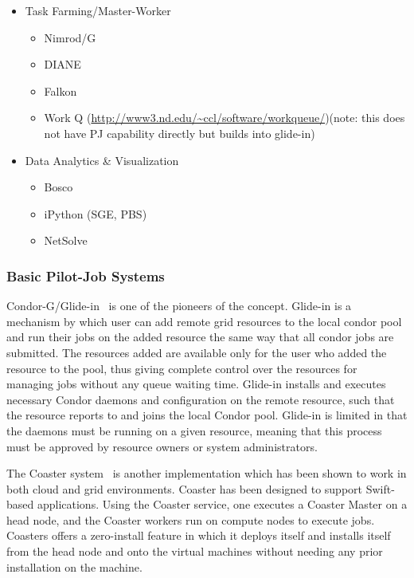 \documentclass{sig-alternate}
\begin{document}
\begin{itemize}
\begin{itemize}
\begin{itemize}
		\end{itemize}
		\item Task Farming/Master-Worker
		\begin{itemize}
			\item Nimrod/G 
			\item DIANE
			\item Falkon 
            \item Work Q (\url{http://www3.nd.edu/~ccl/software/workqueue/})(note: this does not have PJ capability directly but builds into glide-in)
		\end{itemize}
		\item Data Analytics \& Visualization
		\begin{itemize}
			\item Bosco
			\item iPython (SGE, PBS)
			\item NetSolve~\cite{Casanova:1995:NNS:898848}
		\end{itemize}		
	\end{itemize}
\end{itemize}

\subsubsection{Basic Pilot-Job Systems}
Condor-G/Glide-in~\cite{condor-g} is one of the pioneers of the \pilotjob
concept. Glide-in is a mechanism by which user can add remote grid resources
to the local condor pool and run their jobs on the added resource the same way
that all condor jobs are submitted. The resources added are available only for
the user who added the resource to the pool, thus giving complete control over
the resources for managing jobs without any queue waiting time. Glide-in
installs and executes necessary Condor daemons and configuration on the remote
resource, such that the resource reports to and joins the local Condor pool.
Glide-in is limited in that the daemons must be running on a given resource,
meaning that this process must be approved by resource owners or system
administrators.

The Coaster system~\cite{coasters} is another \pilotjob implementation
which has been shown to work in both cloud and grid
environments. Coaster has been designed to support Swift-based applications. Using the Coaster service, one executes a Coaster Master
on a head node, and the Coaster workers run on compute nodes to
execute jobs. Coasters offers a zero-install feature in which it
deploys itself and installs itself from the head node and onto the
virtual machines without needing any prior installation on the
machine. 
\end{document}
